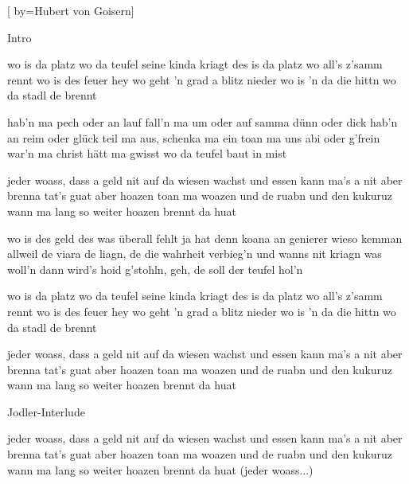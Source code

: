 [
	by={Hubert von Goisern}]


\beginchorus
Intro
\endchorus


\beginverse
wo is da platz wo da teufel seine kinda kriagt
des is da platz wo all's z'samm rennt
wo is des feuer hey wo geht 'n grad a blitz nieder
wo is 'n da die hittn wo da stadl de brennt
\endverse

\beginverse
hab'n ma pech oder an lauf fall'n ma um oder auf
samma dünn oder dick hab'n an reim oder glück
teil ma aus, schenka ma ein toan ma uns abi oder g'frein
war'n ma christ hätt ma gwisst wo da teufel baut in mist
\endverse

\beginchorus
jeder woass, dass a geld nit auf da wiesen wachst
und essen kann ma's a nit aber brenna tat's guat
aber hoazen toan ma woazen und de ruabn und den kukuruz
wann ma lang so weiter hoazen brennt da huat
\endchorus

\beginverse
wo is des geld des was überall fehlt
ja hat denn koana an genierer wieso kemman allweil de viara
de liagn, de die wahrheit verbieg'n und wanns nit kriagn was woll'n
dann wird's hoid g'stohln, geh, de soll der teufel hol'n
\endverse

\beginverse
wo is da platz wo da teufel seine kinda kriagt
des is da platz wo all's z'samm rennt
wo is des feuer hey wo geht 'n grad a blitz nieder
wo is 'n da die hittn wo da stadl de brennt
\endverse

\beginchorus
jeder woass, dass a geld nit auf da wiesen wachst
und essen kann ma's a nit aber brenna tat's guat
aber hoazen toan ma woazen und de ruabn und den kukuruz
wann ma lang so weiter hoazen brennt da huat
\endchorus

\beginchorus
Jodler-Interlude
\endchorus

\beginchorus
jeder woass, dass a geld nit auf da wiesen wachst
und essen kann ma's a nit aber brenna tat's guat
aber hoazen toan ma woazen und de ruabn und den kukuruz
wann ma lang so weiter hoazen brennt da huat (jeder woass...)
\endchorus


\endsong
